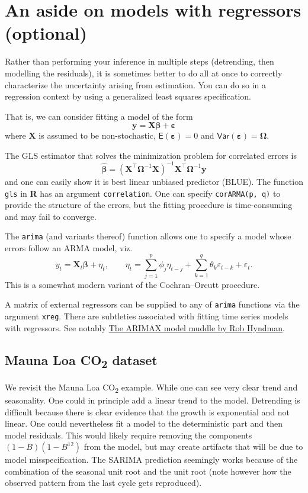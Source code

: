 \documentclass[]{book}
\begin{document}
\section{An aside on models with regressors
(optional)}\label{an-aside-on-models-with-regressors-optional}

Rather than performing your inference in multiple steps (detrending,
then modelling the residuals), it is sometimes better to do all at once
to correctly characterize the uncertainty arising from estimation. You
can do so in a regression context by using a generalized least squares
specification.

That is, we can consider fitting a model of the form
\[\boldsymbol{y} = \mathbf{X}\boldsymbol{\beta}+\boldsymbol{\varepsilon}\]
where \(\mathbf{X}\) is assumed to be non-stochastic,
\(\mathsf{E}(\boldsymbol{\varepsilon}) = 0\) and
\(\mathsf{Var}(\boldsymbol{\varepsilon}) = \boldsymbol{\Omega}\).

The GLS estimator that solves the minimization problem for correlated
errors is
\[\boldsymbol{\hat{\beta}} = (\mathbf{X}^\top\boldsymbol{\Omega}^{-1}\mathbf{X})^{-1}\mathbf{X}^\top\boldsymbol{\Omega}^{-1}\boldsymbol{y}\]
and one can easily show it is best linear unbiased predictor (BLUE). The
function \texttt{gls} in \textbf{R} has an argument
\texttt{correlation}. One can specify \texttt{corARMA(p,\ q)} to provide
the structure of the errors, but the fitting procedure is time-consuming
and may fail to converge.

The \texttt{arima} (and variants thereof) function allows one to specify
a model whose errors follow an ARMA model, viz.
\[ y_t = \mathbf{X}_t\boldsymbol{\beta} + \eta_t, \qquad \eta_t = \sum_{j = 1}^p\phi_j\eta_{t-j} + \sum_{k = 1}^q \theta_k\varepsilon_{t-k} + \varepsilon_t.\]
This is a somewhat modern variant of the Cochran--Orcutt procedure.

A matrix of external regressors can be supplied to any of \texttt{arima}
functions via the argument \texttt{xreg}. There are subtleties
associated with fitting time series models with regressors. See notably
\href{http://robjhyndman.com/hyndsight/arimax/}{The ARIMAX model muddle
by Rob Hyndman}.

\subsection{\texorpdfstring{Mauna Loa CO\textsubscript{2}
dataset}{Mauna Loa CO2 dataset}}\label{mauna-loa-co2-dataset}

We revisit the Mauna Loa CO\textsubscript{2} example. While one can see
very clear trend and seasonality. One could in principle add a linear
trend to the model. Detrending is difficult because there is clear
evidence that the growth is exponential and not linear. One could
nevertheless fit a model to the deterministic part and then model
residuals. This would likely require removing the components
\((1-B)(1-B^{12})\) from the model, but may create artifacts that will
be due to model misspecification. The SARIMA prediction seemingly works
because of the combination of the seasonal unit root and the unit root
(note however how the observed pattern from the last cycle gets
reproduced).
\end{document}
